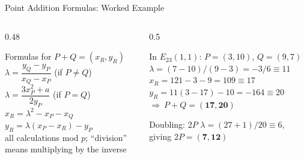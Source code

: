 \documentclass[aspectratio=169,11pt,xcolor={table}]{beamer}
\begin{document}
\begin{frame}{Point Addition Formulas: Worked Example}
  \begin{columns}[T]
    \begin{column}{0.48\textwidth}
      \begin{block}{Formulas for $P + Q = (x_R, y_R)$}
        \small
        $\lambda = \dfrac{y_Q - y_P}{x_Q - x_P}$ \quad (if $P \neq Q$)\\[4pt]
        $\lambda = \dfrac{3x_P^2 + a}{2y_P}$ \quad (if $P = Q$)\\[4pt]
        $x_R = \lambda^2 - x_P - x_Q$\\[2pt]
        $y_R = \lambda(x_P - x_R) - y_P$\\[2pt]
        all calculations mod $p$; ``division'' means multiplying by the inverse
      \end{block}
    \end{column}
    \begin{column}{0.5\textwidth}
      \begin{exampleblock}{In $E_{23}(1,1)$: $P = (3,10)$, $Q = (9,7)$}
        \small
        $\lambda = (7-10)/(9-3) = -3/6 \equiv 11$\\
        $x_R = 121 - 3 - 9 = 109 \equiv 17$\\
        $y_R = 11(3 - 17) - 10 = -164 \equiv 20$\\[3pt]
        $\Rightarrow\ P + Q = \mathbf{(17, 20)}$
      \end{exampleblock}
      \begin{exampleblock}{Doubling: $2P$}
        \small $\lambda = (27 + 1)/20 \equiv 6$, giving $2P = \mathbf{(7, 12)}$
      \end{exampleblock}
    \end{column}
  \end{columns}
\end{frame}
\end{document}

